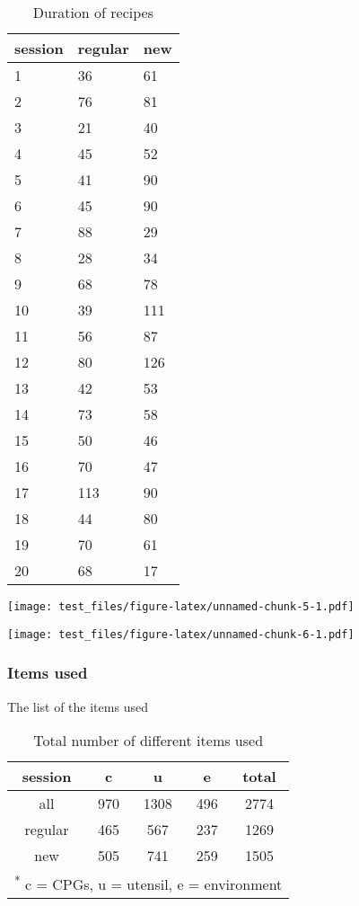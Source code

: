 \documentclass[]{article}
\begin{document}
\begin{table}

\caption{\label{tab:unnamed-chunk-4}Duration of recipes}
\centering
\begin{tabular}[t]{l|l|l}
\hline
session & regular & new\\
\hline
\rowcolor{gray!6}  1 & 36 & 61\\
\hline
2 & 76 & 81\\
\hline
\rowcolor{gray!6}  3 & 21 & 40\\
\hline
4 & 45 & 52\\
\hline
\rowcolor{gray!6}  5 & 41 & 90\\
\hline
6 & 45 & 90\\
\hline
\rowcolor{gray!6}  7 & 88 & 29\\
\hline
8 & 28 & 34\\
\hline
\rowcolor{gray!6}  9 & 68 & 78\\
\hline
10 & 39 & 111\\
\hline
\rowcolor{gray!6}  11 & 56 & 87\\
\hline
12 & 80 & 126\\
\hline
\rowcolor{gray!6}  13 & 42 & 53\\
\hline
14 & 73 & 58\\
\hline
\rowcolor{gray!6}  15 & 50 & 46\\
\hline
16 & 70 & 47\\
\hline
\rowcolor{gray!6}  17 & 113 & 90\\
\hline
18 & 44 & 80\\
\hline
\rowcolor{gray!6}  19 & 70 & 61\\
\hline
20 & 68 & 17\\
\hline
\end{tabular}
\end{table}

\texttt{[image: test\_files/figure-latex/unnamed-chunk-5-1.pdf]}

\texttt{[image: test\_files/figure-latex/unnamed-chunk-6-1.pdf]}

\subsubsection{Items used}\label{items-used}

The list of the items used

\begin{table}

\caption{\label{tab:unnamed-chunk-7}Total number of different items used}
\centering
\begin{tabular}[t]{c|c|c|c|c}
\hline
session & c & u & e & total\\
\hline
all & 970 & 1308 & 496 & 2774\\
\hline
regular & 465 & 567 & 237 & 1269\\
\hline
new & 505 & 741 & 259 & 1505\\
\hline
\multicolumn{5}{l}{\textsuperscript{*} c = CPGs, u = utensil, e = environment}\\
\end{tabular}
\end{table}
\end{document}
